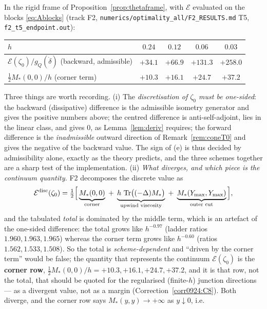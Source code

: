 \documentclass[11pt]{article}
\begin{document}
\begin{remark}\label{rem:T5}
In the rigid frame of Proposition~\ref{prop:thetaframe}, with $\mathcal E$ evaluated on the
blocks \eqref{eq:Ablocks} (track F2, \texttt{numerics/optimality\_all/F2\_RESULTS.md} T5,
\texttt{f2\_t5\_endpoint.out}):
\begin{center}\small
\begin{tabular}{@{}lcccc@{}}
\hline
$h$ & $0.24$ & $0.12$ & $0.06$ & $0.03$\\ \hline
$\mathcal E(\zeta_0)/g_Q(\dot\delta)$ (backward, admissible) & $+34.1$ & $+66.9$ & $+131.3$ & $+258.0$\\
$\tfrac12M_*(0,0)/h$ (corner term) & $+10.3$ & $+16.1$ & $+24.7$ & $+37.2$\\
\hline
\end{tabular}
\end{center}
Three things are worth recording.  (i) The \emph{discretisation of $\zeta_0$ must be
one-sided}: the backward (dissipative) difference is the admissible isometry generator and
gives the positive numbers above; the centred difference is anti-self-adjoint, lies in the
linear class, and gives $0$, as Lemma~\ref{lem:deriv} requires; the forward difference is
the \emph{inadmissible} outward direction of Remark~\ref{rem:coneT0} and gives the negative
of the backward value.  The sign of (e) is thus decided by admissibility alone, exactly as
the theory predicts, and the three schemes together are a sharp test of the implementation.
(ii) \emph{What diverges, and which piece is the continuum quantity.}  F2 decomposes the
discrete value as
\begin{equation}\label{eq:T5decomp}
 \mathcal E^{\rm disc}(\zeta_0)=\tfrac12\Bigl[\,\underbrace{M_*(0,0)}_{\text{corner}}
  \;+\;\underbrace{h\,\operatorname{Tr}\bigl((-\Delta)M_*\bigr)}_{\text{upwind viscosity}}
  \;+\;\underbrace{M_*(Y_{\max},Y_{\max})}_{\text{outer cut}}\,\Bigr],
\end{equation}
and the tabulated \emph{total} is dominated by the middle term, which is an artefact of the
one-sided difference: the total grows like $h^{-0.97}$ (ladder ratios $1.960,1.963,1.965$)
whereas the corner term grows like $h^{-0.60}$ (ratios $1.562,1.533,1.508$).  So the total
is \emph{scheme-dependent} and ``driven by the corner term'' would be false; the quantity
that represents the continuum $\mathcal E(\zeta_0)$ is the \textbf{corner row},
$\frac12M_*(0,0)/h=+10.3,+16.1,+24.7,+37.2$, and it is that row, not the total, that should be
quoted for the regularised (finite-$h$) junction directions --- as a divergent value, not as a margin (Correction~\ref{corr0924:C8}).  Both diverge, and the corner row says $M_*(y,y)\to+\infty$ as $y\downarrow0$, i.e.\

\end{remark}
\end{document}
